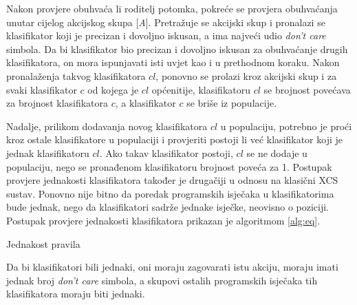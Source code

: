 \documentclass[times, utf8, zavrsni]{fer}
\begin{document}
Nakon provjere obuhvaća li roditelj potomka, pokreće se provjera obuhvaćanja unutar cijelog akcijskog skupa [\emph{A}].
Pretražuje se akcijski skup i pronalazi se klasifikator koji je precizan i dovoljno iskusan, a ima najveći udio \emph{don't care} simbola.
Da bi klasifikator bio precizan i dovoljno iskusan za obuhvaćanje drugih klasifikatora, on mora ispunjavati isti uvjet kao i u prethodnom koraku.
Nakon pronalaženja takvog klasifikatora $cl$, ponovno se prolazi kroz akcijski skup i za svaki klasifikator $c$ od kojega je $cl$ općenitije, klasifikatoru $cl$ se brojnost povećava za brojnost klasifikatora $c$, a klasifikator $c$ se briše iz populacije.

Nadalje, prilikom dodavanja novog klasifikatora $cl$ u populaciju, potrebno je proći kroz ostale klasifikatore u populaciji i provjeriti postoji li već klasifikator koji je jednak klasifikatoru $cl$.
Ako takav klasifikator postoji, $cl$ se ne dodaje u populaciju, nego se pronađenom klasifikatoru brojnost poveća za 1.
Postupak provjere jednakosti klasifikatora također je drugačiji u odnosu na klasični XCS sustav.
Ponovno nije bitno da poredak programskih isječaka u klasifikatorima bude jednak, nego da klasifikatori sadrže jednake isječke, neovisno o poziciji.
Postupak provjere jednakosti klasifikatora prikazan je algoritmom \ref{alg:eq}.
\begin{algorithm}
    \caption{Jednakost pravila}
    \label{alg:eq}
    \begin{algorithmic}
        \ENDIF
        \ENDIF
        \ENDIF
    \end{algorithmic}
\end{algorithm}
Da bi klasifikatori bili jednaki, oni moraju zagovarati istu akciju, moraju imati jednak broj \emph{don't care} simbola, a skupovi ostalih programskih isječaka tih klasifikatora moraju biti jednaki.
\end{document}
